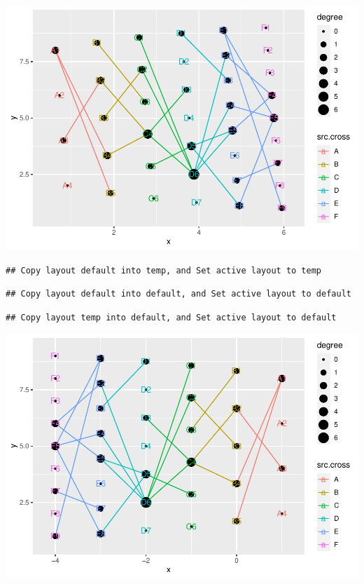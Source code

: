 \documentclass[
]{article}
\newenvironment{Shaded}{\begin{snugshade}}{\end{snugshade}}
\newcommand{\CommentTok}[1]{\textcolor[rgb]{0.56,0.35,0.01}{\textit{#1}}}
\newcommand{\DataTypeTok}[1]{\textcolor[rgb]{0.13,0.29,0.53}{#1}}
\newcommand{\DecValTok}[1]{\textcolor[rgb]{0.00,0.00,0.81}{#1}}
\newcommand{\KeywordTok}[1]{\textcolor[rgb]{0.13,0.29,0.53}{\textbf{#1}}}
\newcommand{\NormalTok}[1]{#1}
\newcommand{\OperatorTok}[1]{\textcolor[rgb]{0.81,0.36,0.00}{\textbf{#1}}}
\newcommand{\StringTok}[1]{\textcolor[rgb]{0.31,0.60,0.02}{#1}}
\begin{document}
\includegraphics{ReadMe_files/figure-latex/unnamed-chunk-6-3.pdf}

\begin{Shaded}
\end{Shaded}

\begin{verbatim}
## Copy layout default into temp, and Set active layout to temp
\end{verbatim}

\begin{verbatim}
## Copy layout default into default, and Set active layout to default
\end{verbatim}

\begin{verbatim}
## Copy layout temp into default, and Set active layout to default
\end{verbatim}

\includegraphics{ReadMe_files/figure-latex/unnamed-chunk-6-4.pdf}
\end{document}
